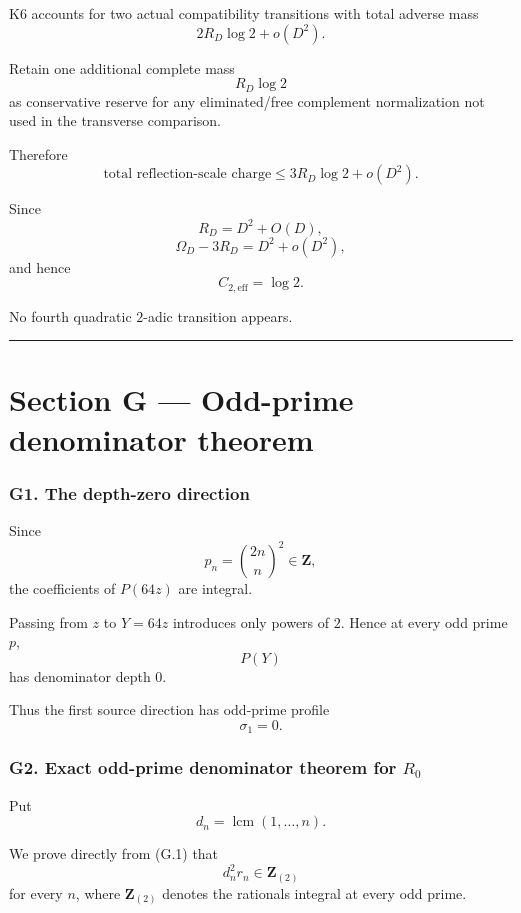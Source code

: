 \documentclass[
  10pt,
  letterpaper,
]{article}
\theoremstyle{definition}
\theoremstyle{remark}
\begin{document}
K6 accounts for two actual compatibility transitions with total adverse
mass \[
2R_D\log2+o(D^2).
\]

Retain one additional complete mass \[
R_D\log2
\] as conservative reserve for any eliminated/free complement
normalization not used in the transverse comparison.

Therefore \[
\boxed{
\text{total reflection-scale charge}
\le
3R_D\log2+o(D^2).
}
\tag{K7.1}
\]

Since \[
R_D=D^2+O(D),
\] \[
\Omega_D-3R_D
=
D^2+o(D^2),
\] and hence \[
\boxed{
C_{2,\mathrm{eff}}=\log2.
}
\tag{K7.2}
\]

No fourth quadratic \(2\)-adic transition appears.

\begin{center}\rule{0.5\linewidth}{0.5pt}\end{center}

\section{Section G --- Odd-prime denominator
theorem}\label{section-g-odd-prime-denominator-theorem}

\subsubsection{G1. The depth-zero
direction}\label{g1.-the-depth-zero-direction}

Since \[
p_n=\binom{2n}{n}^2\in\mathbf Z,
\] the coefficients of \(P(64z)\) are integral.

Passing from \(z\) to \(Y=64z\) introduces only powers of \(2\). Hence
at every odd prime \(p\), \[
P(Y)
\] has denominator depth \(0\).

Thus the first source direction has odd-prime profile \[
\boxed{\sigma_1=0.}
\]

\subsubsection{\texorpdfstring{G2. Exact odd-prime denominator theorem
for
\(R_0\)}{G2. Exact odd-prime denominator theorem for R\_0}}\label{g2.-exact-odd-prime-denominator-theorem-for-r_0}

Put \[
d_n=\operatorname{lcm}(1,\dots,n).
\]

We prove directly from (G.1) that \[
\boxed{
d_n^2r_n\in\mathbf Z_{(2)}
}
\] for every \(n\), where \(\mathbf Z_{(2)}\) denotes the rationals
integral at every odd prime.
\end{document}

